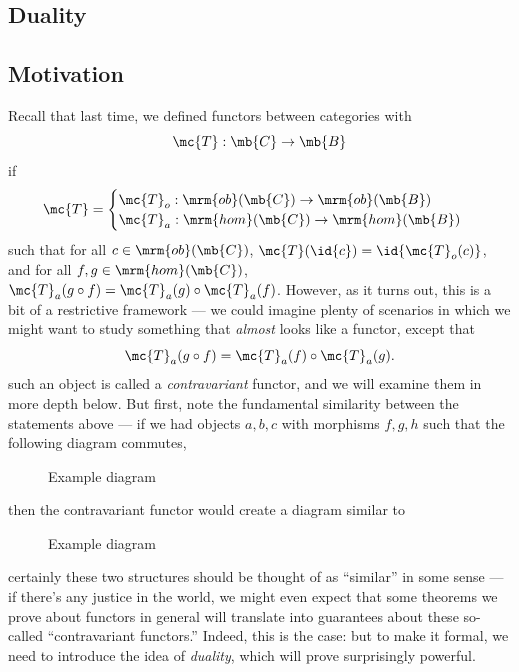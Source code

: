 \documentclass{fkbook}
\newcommand{\ob}{\mrm{ob}}
\newcommand{\homm}{\mrm{hom}}
\begin{document}
\begin{adjustwidth}{1em}{1em}
  \section{Duality}
  \subsection{Motivation}
  Recall that last time, we defined functors between categories with
  \[
    \mc{T} : \mb{C} \to \mb{B}
  \]
  if
  \[
    \mc{T} =
    \begin{cases}
      \mc{T}_o : \ob(\mb{C}) \to \ob(\mb{B}) &  \\
      \mc{T}_a : \homm(\mb{C}) \to \homm(\mb{B}) &
    \end{cases}
  \]
  such that for all $c \in \ob(\mb{C})$, $\mc{T}(\id{c}) =
  \id{\mc{T}_o(c)}$, and for all $f,g \in \homm(\mb{C})$, $\mc{T}_a
  (g \circ f) = \mc{T}_a(g) \circ \mc{T}_a(f)$. However, as it turns
  out, this is a bit of a restrictive framework --- we could imagine
  plenty of scenarios in which we might want to study something that
  \emph{almost} looks like a functor, except that
  \[
    \mc{T}_a(g \circ f) = \mc{T}_a(f) \circ \mc{T}_a(g).
  \]
  such an object is called a \emph{contravariant} functor, and we will
  examine them in more depth below. But first, note the fundamental
  similarity between the statements above --- if we had objects
  $a,b,c$ with morphisms $f,g,h$ such that the following diagram
  commutes,
  \begin{figure}[H]
    \centering
    \tikzset{node distance=2cm, auto}
    \caption{Example diagram}
  \end{figure}
  then the contravariant functor would create a diagram similar to
  \begin{figure}[H]
    \centering
    \hspace{1.2cm}
    \tikzset{node distance=2cm, auto}
    \caption{Example diagram}
  \end{figure}
  certainly these two structures should be thought of as ``similar''
  in some sense --- if there's any justice in the world, we might even
  expect that some theorems we prove about functors in general will
  translate into guarantees about these so-called ``contravariant
  functors.'' Indeed, this is the case: but to make it formal, we need
  to introduce the idea of \emph{duality}, which will prove
  surprisingly powerful.

\end{adjustwidth}
\end{document}
